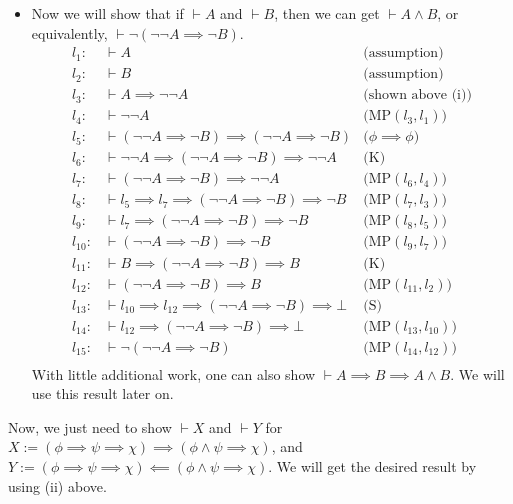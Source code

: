 \begin{itemize}
\begin{itemize}
\begin{itemize}
         \item[(ii)] Now we will show that if $\vdash A$ and $\vdash B$, 
         then we can get $\vdash A \land B$, or equivalently, 
         $\vdash \neg (\neg \neg A \implies \neg B)$.
            \begin{align*}
                l_1: &\vdash A  &\text{(assumption)} \\
                l_2: &\vdash  B &\text{(assumption)} \\
                l_3: &\vdash A \implies \neg \neg A &\text{(shown above (i))} \\
                l_4: &\vdash \neg \neg A &\text{(MP$(l_3, l_1)$)} \\
                l_5: &\vdash (\neg \neg A \implies \neg B) \implies (\neg \neg A \implies \neg B) &\text{($\phi \implies \phi$)} \\
                l_6: &\vdash \neg \neg A \implies (\neg \neg A \implies \neg B) \implies \neg \neg A  &\text{(K)} \\
                l_7: &\vdash (\neg \neg A \implies \neg B) \implies \neg \neg A &\text{(MP$(l_6, l_4)$)} \\
                l_8: &\vdash l_5 \implies l_7 \implies (\neg \neg A \implies \neg B) \implies \neg B &\text{(MP$(l_7, l_3)$)} \\
                l_{9}: &\vdash  l_7 \implies (\neg \neg A \implies \neg B) \implies \neg B &\text{(MP$(l_8, l_5)$)} \\
                l_{10}: &\vdash (\neg \neg A \implies \neg B) \implies \neg B &\text{(MP$(l_9, l_7)$)} \\
                l_{11}: &\vdash B \implies (\neg \neg A \implies \neg B) \implies B &\text{(K)} \\
                l_{12}: &\vdash (\neg \neg A \implies \neg B) \implies B  &\text{(MP$(l_{11}, l_{2})$)} \\
                l_{13}: &\vdash l_{10} \implies l_{12} \implies (\neg \neg A \implies \neg B) \implies \bot &\text{(S)} \\
                l_{14}: &\vdash l_{12} \implies (\neg \neg A \implies \neg B) \implies \bot &\text{(MP$(l_{13}, l_{10})$)} \\
                l_{15}: &\vdash \neg (\neg \neg A \implies \neg B) &\text{(MP$(l_{14}, l_{12})$)} \\
         \end{align*}
         With little additional work, one can also show $\vdash A \implies B \implies A \land B$. We will use this result later on.
        \end{itemize}
    Now, we just need to show $\vdash X$ and $\vdash Y$ for 
         $X := (\phi \implies \psi \implies \chi) \implies (\phi \land \psi \implies \chi)$, and $Y := (\phi \implies \psi \implies \chi) \impliedby (\phi \land \psi \implies \chi)$. 
         We will get the desired result by using (ii) above.
         

\end{itemize}
\end{itemize}
